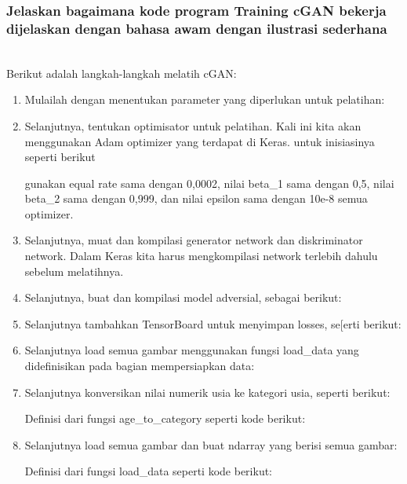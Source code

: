 \subsubsection{Jelaskan bagaimana kode program Training cGAN bekerja dijelaskan dengan bahasa awam dengan ilustrasi sederhana}
\hfill\\
Berikut adalah langkah-langkah melatih cGAN:
\begin{enumerate}
\item Mulailah dengan menentukan parameter yang diperlukan untuk pelatihan:


\item Selanjutnya, tentukan optimisator untuk pelatihan. Kali ini kita akan menggunakan Adam optimizer yang terdapat di Keras. untuk inisiasinya seperti berikut

gunakan equal rate sama dengan 0,0002, nilai beta\_1 sama dengan 0,5, nilai beta\_2 sama dengan 0,999, dan nilai epsilon sama dengan 10e-8 semua optimizer.

\item Selanjutnya, muat dan kompilasi generator network dan diskriminator network. Dalam Keras kita harus mengkompilasi network terlebih dahulu sebelum melatihnya.


\item Selanjutnya, buat dan kompilasi model adversial, sebagai berikut:


\item Selanjutnya tambahkan TensorBoard untuk menyimpan losses, se[erti berikut:


\item Selanjutnya load semua gambar menggunakan fungsi load\_data yang didefinisikan pada bagian mempersiapkan data:


\item Selanjutnya konversikan nilai numerik usia ke kategori usia, seperti berikut:

Definisi dari fungsi age\_to\_category seperti kode berikut:


\item Selanjutnya load semua gambar dan buat ndarray yang berisi semua gambar:

Definisi dari fungsi load\_data seperti kode berikut:



\end{enumerate}
